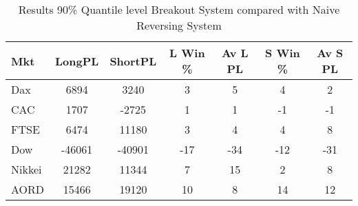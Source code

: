 \begin{table}[ht]
\centering
\caption[Daily 90\% Quantile level Breakout System compared with Naive Reversing System]{Results 90\% Quantile level Breakout System compared with Naive Reversing System} 
\label{tab:chp_ta_90q_diff}
\begin{tabular}{lcccccc}
  \toprule Mkt & LongPL & ShortPL & L Win \% & Av L PL & S Win \% & Av S PL \\ 
  \midrule Dax & 6894 & 3240 & 3 & 5 & 4 & 2 \\ 
  CAC & 1707 & -2725 & 1 & 1 & -1 & -1 \\ 
  FTSE & 6474 & 11180 & 3 & 4 & 4 & 8 \\ 
  Dow & -46061 & -40901 & -17 & -34 & -12 & -31 \\ 
  Nikkei & 21282 & 11344 & 7 & 15 & 2 & 8 \\ 
  AORD & 15466 & 19120 & 10 & 8 & 14 & 12 \\ 
   \bottomrule \end{tabular}
\end{table}
